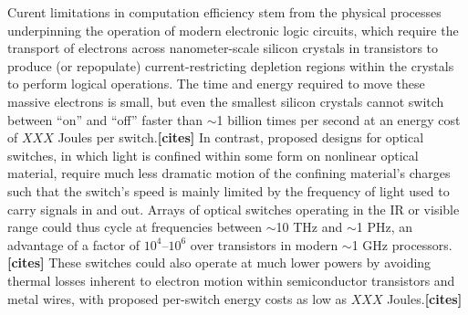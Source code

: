 \documentclass[11pt,a4paper]{article}
\begin{document}
Curent limitations in computation efficiency stem from the physical processes underpinning the operation of modern electronic logic circuits, which require the transport of electrons across nanometer-scale silicon crystals in transistors to produce (or repopulate) current-restricting depletion regions within the crystals to perform logical operations. The time and energy required to move these massive electrons is small, but even the smallest silicon crystals cannot switch between ``on'' and ``off'' faster than $\sim$1 billion times per second at an energy cost of $XXX$ Joules per switch.\textbf{[cites]} In contrast, proposed designs for optical switches, in which light is confined within some form on nonlinear optical material, require much less dramatic motion of the confining material's charges such that the switch's speed is mainly limited by the frequency of light used to carry signals in and out. Arrays of optical switches operating in the IR or visible range could thus cycle at frequencies between $\sim$10 THz and $\sim$1 PHz, an advantage of a factor of $10^4$--$10^6$ over transistors in modern $\sim$1 GHz processors.\textbf{[cites]} These switches could also operate at much lower powers by avoiding thermal losses inherent to electron motion within semiconductor transistors and metal wires, with proposed per-switch energy costs as low as $XXX$ Joules.\textbf{[cites]}



\end{document}
